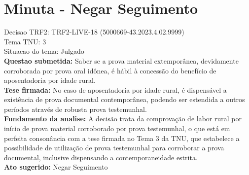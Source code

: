 \documentclass{article}
\begin{document}
\section*{Minuta - Negar Seguimento}
Decisao TRF2: TRF2-LIVE-18 (5000669-43.2023.4.02.9999)\\
Tema TNU: 3\\
Situacao do tema: Julgado\\
\textbf{Questao submetida:} Saber se a prova material extemporânea, devidamente corroborada por prova oral idônea, é hábil à concessão do benefício de aposentadoria por idade rural.\\
\textbf{Tese firmada:} No caso de aposentadoria por idade rural, é dispensável a existência de prova documental contemporânea, podendo ser estendida a outros períodos através de robusta prova testemunhal.\\
\textbf{Fundamento da analise:} A decisão trata da comprovação de labor rural por início de prova material corroborado por prova testemunhal, o que está em perfeita consonância com a tese firmada no Tema 3 da TNU, que estabelece a possibilidade de utilização de prova testemunhal para corroborar a prova documental, inclusive dispensando a contemporaneidade estrita.\\
\textbf{Ato sugerido:} Negar Seguimento
\end{document}
